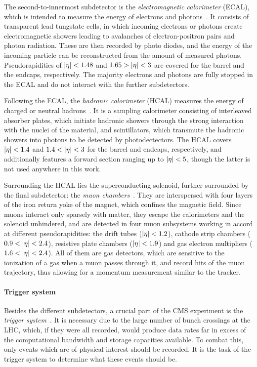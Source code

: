The second-to-innermost subdetector is the \textit{electromagnetic calorimeter} (ECAL), which is intended to measure the energy of electrons and photons~\cite{CMS:1997ysd,CMS:EGM-17-001}. It consists of transparent lead tungstate cells, in which incoming electrons or photons create electromagnetic showers leading to avalanches of electron-positron pairs and photon radiation. These are then recorded by photo diodes, and the energy of the incoming particle can be reconstructed from the amount of measured photons. Pseudorapidities of $|\eta| < 1.48$ and $1.65 > |\eta| < 3$ are covered for the barrel and the endcaps, respectively. The majority electrons and photons are fully stopped in the ECAL and do not interact with the further subdetectors.

Following the ECAL, the \textit{hadronic calorimeter} (HCAL) measures the energy of charged or neutral hadrons~\cite{CMS:1997xji,CMS:2012tda}. It is a sampling calorimeter consisting of interleaved absorber plates, which initiate hadronic showers through the strong interaction with the nuclei of the material, and scintillators, which transmute the hadronic showers into photons to be detected by photodectectors. The HCAL covers $|\eta| < 1.4$ and $1.4 < |\eta| < 3$ for the barrel and endcaps, respectively, and additionally features a forward section ranging up to $|\eta| < 5$, though the latter is not used anywhere in this work.

Surrounding the HCAL lies the superconducting solenoid, further surrounded by the final subdetector: the \textit{muon chambers}~\cite{CMS:1997iti,Pozzobon:2701333}. They are interspersed with four layers of the iron return yoke of the magnet, which confines the magnetic field. Since muons interact only sparsely with matter, they escape the calorimeters and the solenoid unhindered, and are detected in four muon subsystems working in accord at different pseudorapidities: the drift tubes ($|\eta| < 1.2$), cathode strip chambers ($0.9 < |\eta| < 2.4$), resistive plate chambers ($|\eta| < 1.9$) and gas electron multipliers ($1.6 < |\eta| < 2.4$). All of them are gas detectors, which are sensitive to the ionization of a gas when a muon passes through it, and record hits of the muon trajectory, thus allowing for a momentum measurement similar to the tracker.

\paragraph{Trigger system}
Besides the different subdetectors, a crucial part of the CMS experiment is the \textit{trigger system}~\cite{CMS-TRG-12-001}. It is necessary due to the large number of bunch crossings at the LHC, which, if they were all recorded, would produce data rates far in excess of the computational bandwidth and storage capacities available. To combat this, only events which are of physical interest should be recorded. It is the task of the trigger system to determine what these events should be.

